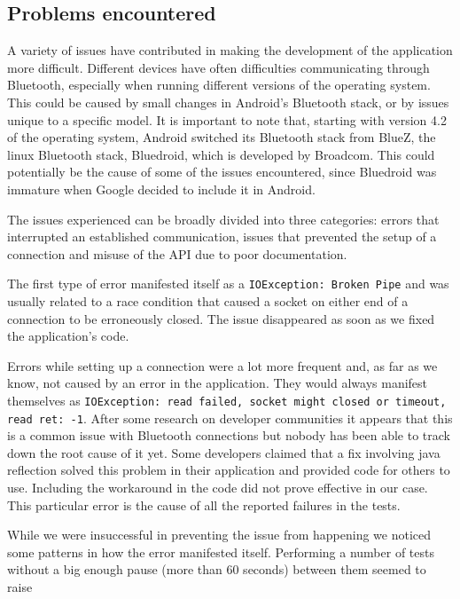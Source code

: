 \subsection{Problems encountered}
A variety of issues have contributed in making the development of the application more difficult.
Different devices have often difficulties communicating through Bluetooth, especially when running different versions of the operating system. This could be caused by small changes in Android's Bluetooth stack, or by issues unique to a specific model.
It is important to note that, starting with version 4.2 of the operating system, Android switched its Bluetooth stack from BlueZ, the linux Bluetooth stack, Bluedroid, which is developed by Broadcom. This could potentially be the cause of some of the issues encountered, since Bluedroid was immature when Google decided to include it in Android.

The issues experienced can be broadly divided into three categories: errors that interrupted an established communication, issues that prevented the setup of a connection and misuse of the API due to poor documentation.

The first type of error manifested itself as a \texttt{IOException: Broken Pipe} and was usually related to a race condition that caused a socket on either end of a connection to be erroneously closed.
The issue disappeared as soon as we fixed the application's code.

Errors while setting up a connection were a lot more frequent and, as far as we know, not caused by an error in the application.
They would always manifest themselves as \texttt{IOException: read failed, socket might closed or timeout, read ret: -1}.
After some research on developer communities it appears that this is a common issue with Bluetooth connections but nobody has been able to track down the root cause of it yet.
Some developers claimed that a fix involving java reflection solved this problem in their application and provided code for others to use.
Including the workaround in the code did not prove effective in our case.
This particular error is the cause of all the reported failures in the tests.

While we were insuccessful in preventing the issue from happening we noticed some patterns in how the error manifested itself.
Performing a number of tests without a big enough pause (more than 60 seconds) between them seemed to raise 

